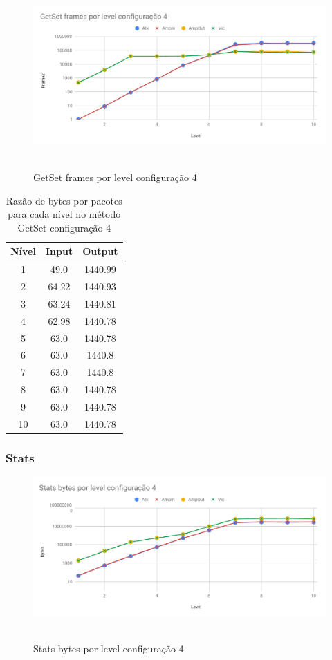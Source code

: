 \begin{figure}[H]
     \centering
     \label{graf:GetSetFrames4}
     \includegraphics[scale=0.6]{img/capturas/GetSetFLC4.pdf}\
     \caption{GetSet frames por level configuração 4}
\end{figure}

\begin{table}[H]
\centering
\label{tab:bytespacsGetSet4}
\caption{Razão de bytes por pacotes para cada nível no método GetSet configuração 4}
\begin{tabular}{|c|c|c|}
\hline
Nível & Input & Output  \\ \hline
1     & 49.0  & 1440.99 \\ \hline
2     & 64.22 & 1440.93 \\ \hline
3     & 63.24 & 1440.81 \\ \hline
4     & 62.98 & 1440.78 \\ \hline
5     & 63.0  & 1440.78 \\ \hline
6     & 63.0  & 1440.8  \\ \hline
7     & 63.0  & 1440.8  \\ \hline
8     & 63.0  & 1440.78 \\ \hline
9     & 63.0  & 1440.78 \\ \hline
10    & 63.0  & 1440.78 \\ \hline
\end{tabular}
\end{table}

\subsubsection{Stats}

\begin{figure}[H]
     \centering
     \label{graf:StatsBytes4}
     \includegraphics[scale=0.6]{img/capturas/StatsBLC4.pdf}\
     \caption{Stats bytes por level configuração 4}
\end{figure}

